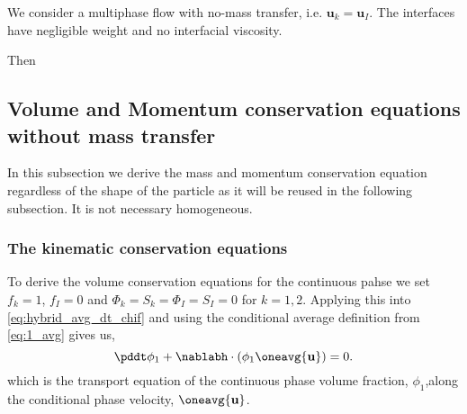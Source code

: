 
We consider a multiphase flow with no-mass transfer, i.e. $\textbf{u}_k=\textbf{u}_I$.
The interfaces have negligible weight and no interfacial viscosity. 

Then 

\subsection{Volume and Momentum conservation equations without mass transfer}

In this subsection we derive the mass and momentum conservation equation regardless of the shape of the particle as it will be reused in the following subsection. 
It is not necessary homogeneous. 
\subsubsection{The kinematic conservation equations}

To derive the volume conservation equations for the continuous pahse we set $f_{k} = 1$, $f_I = 0$ and  $\Phi_{k} = S_{k} =\Phi_{I} = S_{I} = 0$ for $k=1,2$. 
Applying this into \ref{eq:hybrid_avg_dt_chif} and using the conditional average definition from \ref{eq:1_avg} gives us,
\begin{equation}
    \pddt \phi_1
    + \nablabh \cdot (\phi_1 \oneavg{\textbf{u}})
    = 0.
    \label{eq:hybrid_avg_dt_chi}
\end{equation}
which is the transport equation of the continuous phase volume fraction, $\phi_1$,along the conditional phase velocity, $\oneavg{\textbf{u}}$. 

